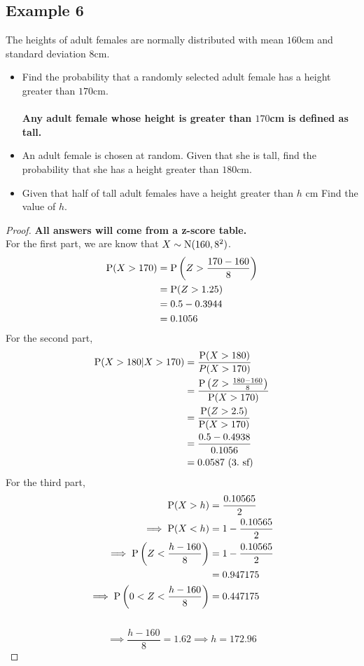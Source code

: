 \documentclass[../setup.tex]{subfiles}
\begin{document}
\subsection{Example 6}
\begin{example}
The heights of adult females are normally distributed with mean $160$cm and standard deviation $8$cm.
\begin{itemize}
	\item Find the probability that a randomly selected adult female has a height greater than $170$cm. \\ \\
\textbf{Any adult female whose height is greater than $170$cm is defined as tall.}
	\item An adult female is chosen at random. Given that she is tall, find the probability that she has a height greater than $180$cm.
	\item Given that half of tall adult females have a height greater than $h$ cm Find the value of $h$.
\end{itemize}
\end{example}
\begin{proof} 
\textbf{All answers will come from a z-score table.} \\
For the first part, we are know that $X \sim \textup{N}(160, 8^2)$.
\begin{align*}
\textup{P}(X > 170) &= \textup{P}\left(Z > \frac{170-160}{8} \right) \\
&= \textup{P}(Z > 1.25) \\
&= 0.5 - 0.3944 \\
&= 0.1056
\end{align*}
For the second part,
\begin{align*}
\textup{P}(X>180 | X>170) &= \frac{\textup{P}(X>180)}{P(X>170)} \\
&= \frac{\textup{P}\left(Z > \frac{180-160}{8}\right)}{\textup{P}(X>170)} \\
&= \frac{\textup{P}(Z>2.5)}{\textup{P}(X>170)} \\
&= \frac{0.5-0.4938}{0.1056} \\
&= 0.0587 \ (3. \text{ sf})
\end{align*}
For the third part,
\begin{align*}
\textup{P}(X>h) &= \frac{0.10565}{2} \\
\implies \textup{P}(X<h) &= 1 - \frac{0.10565}{2} \\
\implies \textup{P}\left(Z<\frac{h-160}{8}\right) &= 1 - \frac{0.10565}{2} \\
&= 0.947175 \\
\implies \textup{P}\left(0<Z<\frac{h-160}{8}\right) &= 0.447175
\end{align*}
 \\
$$\implies \frac{h-160}{8} = 1.62 \implies h = 172.96$$
\end{proof}
\end{document}
